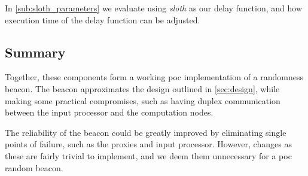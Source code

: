 In \vref{sub:sloth_parameters} we evaluate using \textit{sloth} as our delay function, and how execution time of the delay function can be adjusted.

\subsection{Summary}
Together, these components form a working \acrshort{poc} implementation of a randomness beacon.
The beacon approximates the design outlined in \cref{sec:design}, while making some practical compromises, such as having duplex communication between the input processor and the computation nodes. 

The reliability of the beacon could be greatly improved by eliminating single points of failure, such as the proxies and input processor.
However, changes as these are fairly trivial to implement, and we deem them unnecessary for a \gls{poc} random beacon.
